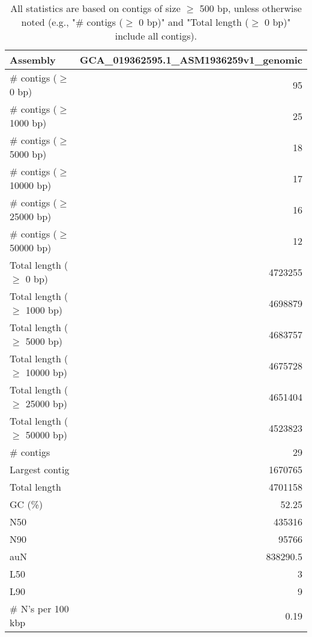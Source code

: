 \documentclass[12pt,a4paper]{article}
\begin{document}
\begin{table}[ht]
\begin{center}
\caption{All statistics are based on contigs of size $\geq$ 500 bp, unless otherwise noted (e.g., "\# contigs ($\geq$ 0 bp)" and "Total length ($\geq$ 0 bp)" include all contigs).}
\begin{tabular}{|l*{1}{|r}|}
\hline
Assembly & GCA\_019362595.1\_ASM1936259v1\_genomic \\ \hline
\# contigs ($\geq$ 0 bp) & 95 \\ \hline
\# contigs ($\geq$ 1000 bp) & 25 \\ \hline
\# contigs ($\geq$ 5000 bp) & 18 \\ \hline
\# contigs ($\geq$ 10000 bp) & 17 \\ \hline
\# contigs ($\geq$ 25000 bp) & 16 \\ \hline
\# contigs ($\geq$ 50000 bp) & 12 \\ \hline
Total length ($\geq$ 0 bp) & 4723255 \\ \hline
Total length ($\geq$ 1000 bp) & 4698879 \\ \hline
Total length ($\geq$ 5000 bp) & 4683757 \\ \hline
Total length ($\geq$ 10000 bp) & 4675728 \\ \hline
Total length ($\geq$ 25000 bp) & 4651404 \\ \hline
Total length ($\geq$ 50000 bp) & 4523823 \\ \hline
\# contigs & 29 \\ \hline
Largest contig & 1670765 \\ \hline
Total length & 4701158 \\ \hline
GC (\%) & 52.25 \\ \hline
N50 & 435316 \\ \hline
N90 & 95766 \\ \hline
auN & 838290.5 \\ \hline
L50 & 3 \\ \hline
L90 & 9 \\ \hline
\# N's per 100 kbp & 0.19 \\ \hline
\end{tabular}
\end{center}
\end{table}
\end{document}
